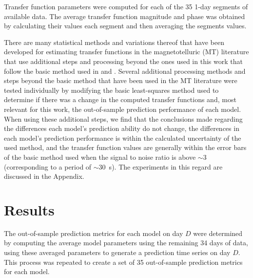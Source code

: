 \documentclass[draft,linenumbers]{agujournal2018}
\begin{document}
Transfer function parameters were computed for each of the 35 1-day segments of available data. The average transfer function magnitude and phase was obtained by calculating their values each segment and then averaging the segments values. 

There are many statistical methods and variations thereof that have been developed for estimating transfer functions in the magnetotelluric (MT) literature that use additional steps and processing \citep{Egbert1986,Chave1987,Chave1989,Jones1989,Larsen1996,Egbert1997,Eisel2001,Chave2004,Chave2012,Chave2017} beyond the ones used in this work that follow the basic method used in \cite{Sims1971} and \cite{Simpson2005}. Several additional processing methods and steps beyond the basic method that have been used in the MT literature were tested individually by modifying the basic least-squares method used to determine if there was a change in the computed transfer functions and, most relevant for this work, the out-of-sample prediction performance of each model. When using these additional steps, we find that the conclusions made regarding the differences each model's prediction ability do not change, the differences in each model's prediction performance is within the calculated uncertainty of the used method, and the transfer function values are generally within the error bars of the basic method used when the signal to noise ratio is above $\sim$3 (corresponding to a period of $\sim 30$~s). The experiments in this regard are discussed in the Appendix.



\section{Results}

The out-of-sample prediction metrics for each model on day $D$ were determined by computing the average model parameters using the remaining 34 days of data, using these averaged parameters to generate a prediction time series on day $D$. This process was repeated to create a set of 35 out-of-sample prediction metrics for each model.
\end{document}
